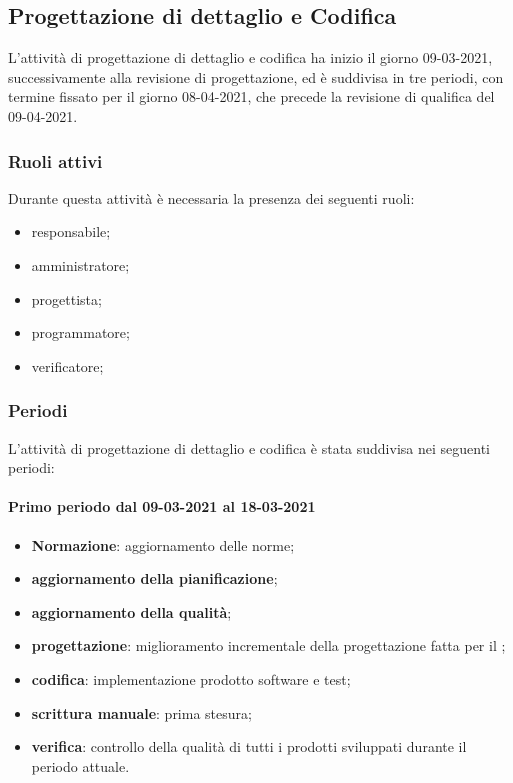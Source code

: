 	\newpage	
	
	\subsection{Progettazione di dettaglio e Codifica}
	L'attività di progettazione di dettaglio e codifica ha inizio il giorno 09-03-2021, successivamente alla
	revisione di progettazione, ed è suddivisa in tre periodi, con termine fissato per il giorno 08-04-2021,
	che precede la revisione di qualifica del 09-04-2021.
	
	\subsubsection{Ruoli attivi}
	Durante questa attività è necessaria la presenza dei seguenti ruoli:
	\begin{itemize}
	\item responsabile;
	\item amministratore;
	\item progettista;
	\item programmatore;
	\item verificatore;
	\end{itemize}

	\subsubsection{Periodi}
	L'attività di progettazione di dettaglio e codifica è stata suddivisa nei seguenti periodi:
	\paragraph{Primo periodo dal 09-03-2021 al 18-03-2021}
	\begin{itemize}
		\item \textbf{Normazione}: aggiornamento delle norme;
		\item \textbf{aggiornamento della pianificazione};
		\item \textbf{aggiornamento della qualità};
		\item \textbf{progettazione}: miglioramento incrementale della progettazione fatta per il ;
		\item \textbf{codifica}: implementazione prodotto software e test;
		\item \textbf{scrittura manuale}: prima stesura;
		\item \textbf{verifica}: controllo della qualità di tutti i prodotti sviluppati durante il periodo attuale.
	\end{itemize}

